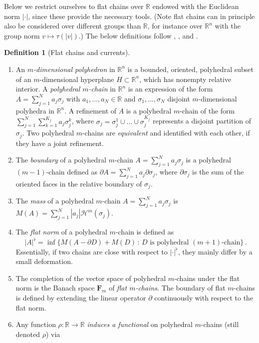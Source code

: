 \documentclass[10pt,a4paper,oneside,final]{article}
\newcommand{\R}{{\mathbb{R}}}
\newcommand{\hd}{\mathcal{H}}
\newcommand{\mass}[1]{M(#1)}
\newcommand{\flatNorm}[1]{|#1|^\flat}
\newcommand{\flatChains}[1]{\mathbf F_{#1}}
\numberwithin{equation}{section}
\theoremstyle{plain}
\theoremstyle{definition}
\newtheorem{definition}[theorem]{Definition}
\theoremstyle{remark}
\begin{document}
Below we restrict ourselves to flat chains over $\R$ endowed with the Euclidean norm $|\cdot|$, since these provide the necessary tools.
(Note flat chains can in principle also be considered over different groups than $\R$, for instance over $\R^n$ with the group norm $v\mapsto\tau(|v|)$.)
The below definitions follow \cite[Ch.\,V.1-3]{Wh57}, \cite[Sec.\,4.1-2]{Fe69}, and \cite[\S26-27]{Si83}.

\begin{definition}[Flat chains and currents]\label{def:flatChains}
\mbox{}
\begin{enumerate}
\item An \emph{$m$-dimensional polyhedron} in $\R^n$ is a bounded, oriented, polyhedral subset of an $m$-dimensional hyperplane $H\subset\R^n$, which has nonempty relative interior.
A \emph{polyhedral $m$-chain} in $\R^n$ is an expression of the form $A=\sum_{j=1}^Na_j\sigma_j$
with $a_1,\ldots,a_N\in\R$ and $\sigma_1,\ldots,\sigma_N$ disjoint $m$-dimensional polyhedra in $\R^n$.
A refinement of $A$ is a polyhedral $m$-chain of the form $\sum_{j=1}^N\sum_{k=1}^{K_j}a_j\sigma_j^k$, where $\sigma_j=\sigma_j^1\cup\ldots\cup\sigma_j^{K_j}$ represents a disjoint partition of $\sigma_j$.
Two polyhedral $m$-chains are \emph{equivalent} and identified with each other, if they have a joint refinement.
\item The \emph{boundary} of a polyhedral $m$-chain $A=\sum_{j=1}^Na_j\sigma_j$ is a polyhedral $(m-1)$-chain defined as $\partial A=\sum_{j=1}^Na_j\partial\sigma_j$,
where $\partial\sigma_j$ is the sum of the oriented faces in the relative boundary of $\sigma_j$.
\item The \emph{mass} of a polyhedral $m$-chain $A=\sum_{j=1}^Na_j\sigma_j$ is $\mass A=\sum_{j=1}^N|a_j|\hd^m(\sigma_j)$.
\item The \emph{flat norm} of a polyhedral $m$-chain is defined as $$\flatNorm A=\inf\{\mass{A-\partial D}+\mass D\,:\,D\text{ is polyhedral }(m+1)\text{-chain}\}\,.$$
Essentially, if two chains are close with respect to $\flatNorm\cdot$, they mainly differ by a small deformation.
\item The completion of the vector space of polyhedral $m$-chains under the flat norm is the Banach space $\flatChains{m}$ of \emph{flat $m$-chains}.
The boundary of flat $m$-chains is defined by extending the linear operator $\partial$ continuously with respect to the flat norm.
\item\label{enm:inducedFunctional} Any function $\rho:\R\to\R$ \emph{induces a functional} on polyhedral $m$-chains (still denoted $\rho$) via

\end{enumerate}
\end{definition}
\end{document}
